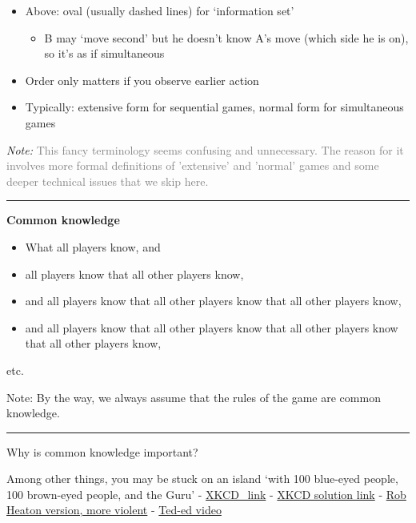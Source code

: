 \documentclass[]{article}
\providecommand{\tightlist}{%
  \setlength{\itemsep}{0pt}\setlength{\parskip}{0pt}}
\begin{document}
\begin{itemize}
\tightlist
\item
  Above: oval (usually dashed lines) for `information set'

  \begin{itemize}
  \tightlist
  \item
    B may `move second' but he doesn't know A's move (which side he is
    on), so it's as if simultaneous
  \end{itemize}
\item
  Order only matters if you observe earlier action
\item
  Typically: extensive form for sequential games, normal form for
  simultaneous games
\end{itemize}

\emph{Note:}
\textcolor{gray}{This fancy terminology seems confusing and unnecessary.  The reason for it involves more formal definitions of 'extensive' and 'normal' games and some deeper technical issues that we skip here.}

\begin{center}\rule{0.5\linewidth}{\linethickness}\end{center}

\textbf{Common knowledge}

\begin{itemize}
\tightlist
\item
  What all players know, and
\item
  all players know that all other players know,
\item
  and all players know that all other players know that all other
  players know,
\item
  and all players know that all other players know that all other
  players know that all other players know,
\end{itemize}

etc.

Note: By the way, we always assume that the rules of the game are common
knowledge.

\begin{center}\rule{0.5\linewidth}{\linethickness}\end{center}

Why is common knowledge important?

Among other things, you may be stuck on an island `with 100 blue-eyed
people, 100 brown-eyed people, and the Guru' -
\href{https://xkcd.com/blue_eyes.html}{XKCD\_link} -
\href{https://xkcd.com/solution.html}{XKCD solution link} -
\href{http://robertheaton.com/2014/01/06/how-to-win-at-dinner-party-the-blue-eyed-islanders/}{Rob
Heaton version, more violent} -
\href{http://ed.ted.com/lessons/the-famously-difficult-green-eyed-logic-puzzle-alex-gendler}{Ted-ed
video}
\end{document}

